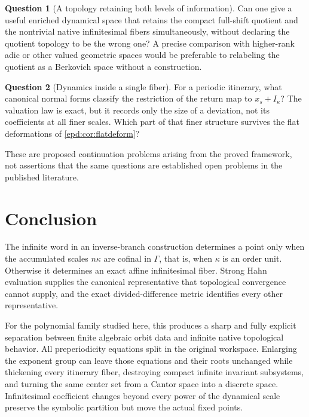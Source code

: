 \documentclass[11pt,a4paper]{article}
\numberwithin{equation}{section}
\theoremstyle{plain}
\theoremstyle{definition}
\newtheorem{question}[question]{Question}
\theoremstyle{remark}
\newcommand{\Ik}{I_\kappa}
\begin{document}
\begin{question}[A topology retaining both levels of information]\label{epd:q:enriched}
Can one give a useful enriched dynamical space that retains the compact
full-shift quotient and the nontrivial native infinitesimal fibers
simultaneously, without declaring the quotient topology to be the
wrong one? A precise comparison with higher-rank adic or other valued
geometric spaces would be preferable to relabeling the quotient as a
Berkovich space without a construction.
\end{question}

\begin{question}[Dynamics inside a single fiber]\label{epd:q:fiber}
For a periodic itinerary, what canonical normal forms classify the
restriction of the return map to $x_s+\Ik$? The valuation law is exact,
but it records only the size of a deviation, not its coefficients at
all finer scales. Which part of that finer structure survives the
flat deformations of \cref{epd:cor:flatdeform}?
\end{question}

These are proposed continuation problems arising from the proved
framework, not assertions that the same questions are established
open problems in the published literature.

\section{Conclusion}
The infinite word in an inverse-branch construction determines a point
only when the accumulated scales $n\kappa$ are cofinal in $\Gamma$, that is, when $\kappa$ is an order unit. Otherwise it determines
an exact affine infinitesimal fiber. Strong Hahn evaluation supplies
the canonical representative that topological convergence cannot
supply, and the exact divided-difference metric identifies every other
representative.

For the polynomial family studied here, this produces a sharp and
fully explicit separation between finite algebraic orbit data and
infinite native topological behavior. All preperiodicity equations
split in the original workspace. Enlarging the exponent group can
leave those equations and their roots unchanged while thickening
every itinerary fiber, destroying compact infinite invariant
subsystems, and turning the same center set from a Cantor space into
a discrete space. Infinitesimal coefficient changes beyond every
power of the dynamical scale preserve the symbolic partition but move
the actual fixed points.
\end{document}
